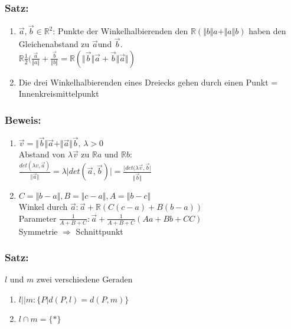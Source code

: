\subsubsection{Satz:}
\begin{enumerate}
	\item $\vec{a},\vec{b}\in\mathbb{R}^{2}$: Punkte der Winkelhalbierenden den 
	$\mathbb{R}(\Vert b\Vert a+\Vert a\Vert b)$ haben den Gleichenabstand zu 
	$\vec{a}$und $\vec{b}$. \\
	$\mathbb{R}\frac{1}{2}(\frac{\vec{a}}{\Vert a\Vert}+\frac{\vec{b}}{\Vert 
	b\Vert}=\mathbb{R}(\Vert \vec{b}\Vert\vec{a}+\vec{b}\Vert\vec{a}\Vert)$
	\item Die drei Winkelhalbierenden eines Dreiecks gehen durch einen Punkt = 
	Innenkreismittelpunkt
\end{enumerate}
%
%
%
\subsubsection{Beweis:}
\begin{enumerate}
	\item $\vec{v}=\Vert\vec{b}\Vert\vec{a}+\Vert\vec{a}\Vert\vec{b}, \, \lambda >0$\\
	Abstand von $\lambda\vec{v}$ zu $\mathbb{R}a$ und $\mathbb{R}b:$\\
	$\frac{det(\lambda v,\vec{a})}{\Vert\vec{a}\Vert}=\lambda \vert det(\vec{a},
	\vec{b})\vert = \frac{\vert det(\lambda \vec{v},\vec{b}\vert}{\Vert\vec{b}\Vert}$
	\item $C = \Vert b-a\Vert, B=\Vert c-a \Vert, A=\Vert b-c \Vert$\\
	Winkel durch $\vec{a}: \vec{a}+\mathbb{R}(C(c-a)+B(b-a))$\\
	Parameter $\frac{1}{A+B+C}:\vec{a}+\frac{1}{A+B+C}(Aa+Bb+CC)$\\
	Symmetrie $\Rightarrow$ Schnittpunkt
\end{enumerate}
%
%
%
\subsubsection{Satz:}
$l$ und $m$ zwei verschiedene Geraden
\begin{enumerate}
	\item $l || m: \{P|d(P,l)=d(P,m)\}$
	\item $l \cap m=\{*\}$
\end{enumerate}
%
%
%
